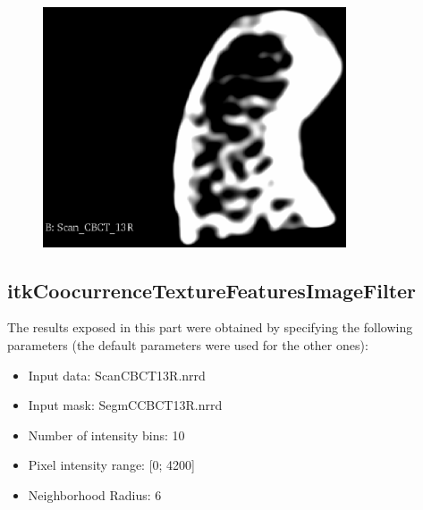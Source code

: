 \documentclass{InsightArticle}
\begin{document}
\begin{figure}[H]
  \begin{center}
    \includegraphics[width=0.8\textwidth]{figures/Scan.eps}
    \label{fig:Scan}
  \end{center}
\end{figure}

\subsection{itkCoocurrenceTextureFeaturesImageFilter}
\label{coocResults}

The results exposed in this part were obtained by specifying the following parameters (the default parameters were used for the other ones):

\begin{itemize}
 \item Input data: Scan\textunderscore CBCT\textunderscore 13R.nrrd
 \item Input mask: SegmC\textunderscore CBCT\textunderscore 13R.nrrd
 \item Number of intensity bins: 10
 \item Pixel intensity range: [0; 4200]
 \item Neighborhood Radius: 6
\end{itemize}
\end{document}
